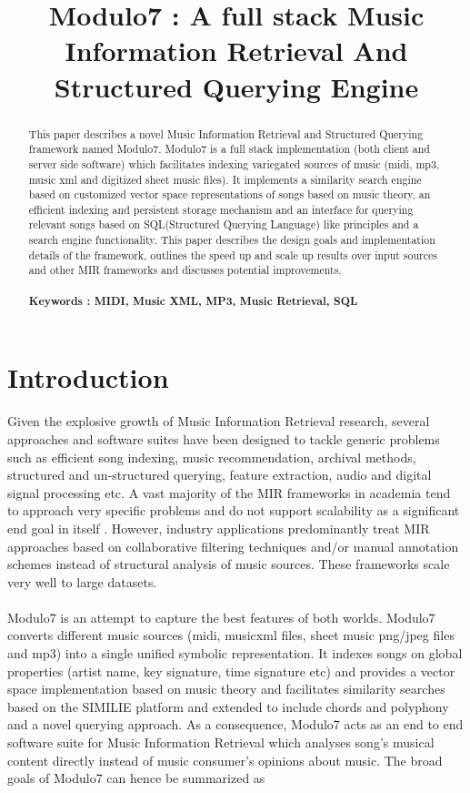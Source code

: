 \documentclass{article}
\title{Modulo7 : A full stack Music Information Retrieval And Structured Querying Engine}
\begin{document}
%
\maketitle
%
\begin{abstract}
This paper describes a novel Music Information Retrieval and Structured Querying framework named Modulo7. Modulo7 is a full stack implementation (both client and server side software) which facilitates indexing variegated sources of music (midi, mp3, music xml and digitized sheet music files). It implements a similarity search engine based on customized vector space representations of songs based on music theory, an efficient indexing and persistent storage mechanism and an interface for querying relevant songs based on SQL(Structured Querying Language) like principles and a search engine functionality. This paper describes the design goals and implementation details of the framework, outlines the speed up and scale up results over input sources and other MIR frameworks and discusses potential improvements. \\\\
\textbf{Keywords : MIDI, Music XML, MP3, Music Retrieval, SQL}
\end{abstract}
%
\section{Introduction}\label{sec:introduction}

Given the explosive growth of Music Information Retrieval research, several approaches and software suites have been designed to tackle generic problems such as efficient song indexing, music recommendation, archival methods, structured and un-structured querying, feature extraction, audio and digital signal processing etc. A vast majority of the MIR frameworks in academia tend to approach very specific problems and do not support scalability as a significant end goal in itself \cite{mirproblems}. However, industry applications predominantly treat MIR approaches based on collaborative filtering techniques \cite{amazonreco} and/or manual annotation schemes \cite{musicgenomepandora} instead of structural analysis of music sources. These frameworks scale very well to large datasets. \\\\
Modulo7 is an attempt to capture the best features of both worlds. Modulo7 converts different music sources (midi, musicxml files, sheet music png/jpeg files and mp3) into a single unified symbolic representation. It indexes songs on global properties (artist name, key signature, time signature etc) and provides a vector space implementation based on music theory and facilitates similarity searches based on the SIMILIE \cite{similie} platform and extended to include chords and polyphony and a novel querying approach. As a consequence, Modulo7 acts as an end to end software suite for Music Information Retrieval which analyses song's musical content directly instead of music consumer's opinions about music. The broad goals of Modulo7 can hence be summarized as
\end{document}
